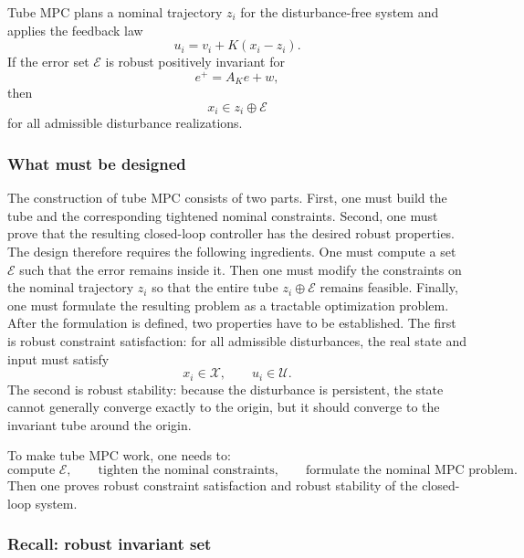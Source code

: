 \begin{theorembox}
Tube MPC plans a nominal trajectory \(z_i\) for the disturbance-free system and applies the
feedback law
\[
    u_i=v_i+K(x_i-z_i).
\]
If the error set \(\mathcal E\) is robust positively invariant for
\[
    e^+=A_Ke+w,
\]
then
\[
    x_i\in z_i\oplus\mathcal E
\]
for all admissible disturbance realizations.
\end{theorembox}

\subsubsection{What must be designed}

The construction of tube MPC consists of two parts. First, one must build the tube and the
corresponding tightened nominal constraints. Second, one must prove that the resulting
closed-loop controller has the desired robust properties.\\

The design therefore requires the following ingredients. One must compute a set
\(\mathcal E\) such that the error remains inside it. Then one must modify the constraints on the
nominal trajectory \(z_i\) so that the entire tube \(z_i\oplus\mathcal E\) remains feasible.
Finally, one must formulate the resulting problem as a tractable optimization problem.\\

After the formulation is defined, two properties have to be established. The first is robust
constraint satisfaction: for all admissible disturbances, the real state and input must satisfy
\[
    x_i\in\mathcal X,
    \qquad
    u_i\in\mathcal U.
\]
The second is robust stability: because the disturbance is persistent, the state cannot generally
converge exactly to the origin, but it should converge to the invariant tube around the origin.

\begin{theorembox}
To make tube MPC work, one needs to:
\[
    \text{compute } \mathcal E,
    \qquad
    \text{tighten the nominal constraints},
    \qquad
    \text{formulate the nominal MPC problem}.
\]
Then one proves robust constraint satisfaction and robust stability of the closed-loop system.
\end{theorembox}

\subsubsection{Recall: robust invariant set}

